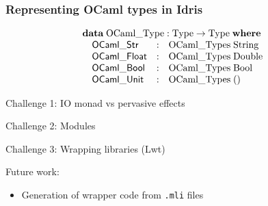 \documentclass[aspectratio=169]{beamer}
\begin{document}
\begin{frame}[t]
  \frametitle{Representing OCaml types in Idris}

  \begin{displaymath}
    \begin{array}{@{}l}
      \textbf{data}\;\mathrm{OCaml\_Type} : \mathrm{Type} \to \mathrm{Type}\;\textbf{where} \\
      \quad
      \begin{array}{@{}l@{\quad:\quad}l}
        \mathsf{OCaml\_Str} & \mathrm{OCaml\_Types}\;\mathrm{String} \\
        \mathsf{OCaml\_Float} & \mathrm{OCaml\_Types}\;\mathrm{Double} \\
        \mathsf{OCaml\_Bool} & \mathrm{OCaml\_Types}\;\mathrm{Bool} \\
        \mathsf{OCaml\_Unit} & \mathrm{OCaml\_Types}\;() \\
      \end{array}
    \end{array}
  \end{displaymath}

\end{frame}

\begin{frame}
  Challenge 1: IO monad vs pervasive effects
\end{frame}

\begin{frame}
  Challenge 2: Modules
\end{frame}

\begin{frame}
  Challenge 3: Wrapping libraries (Lwt)
\end{frame}


\begin{frame}
  Future work:
  \begin{itemize}
  \item Generation of wrapper code from \texttt{.mli} files
  \end{itemize}
\end{frame}
\end{document}
